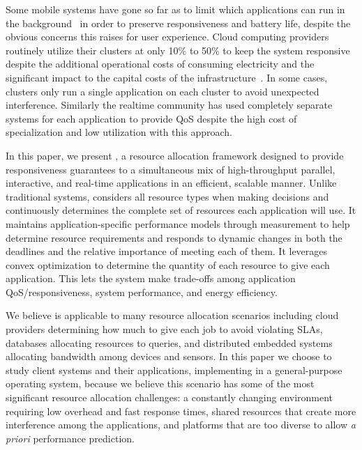 Some mobile systems have gone so far as to limit which applications can run in the background~\cite{iOsDev} in order to preserve responsiveness and battery life, despite the obvious concerns this raises for user experience.  Cloud computing providers routinely utilize their clusters at only 10\% to 50\% to keep the system responsive despite the additional operational costs of consuming electricity and the significant impact to the capital costs of the infrastructure~\cite{Barroso2009,Hennessy2011}.   In some cases, clusters only run a single application on each cluster to avoid unexpected interference.  Similarly the realtime community has used completely separate systems for each application to provide QoS despite the high cost of specialization and low utilization with this approach.

In this paper, we present \pacora, a resource allocation framework designed to provide responsiveness guarantees to a simultaneous mix of high-throughput parallel, interactive, and real-time applications in an efficient, scalable manner.  Unlike traditional systems, \pacora considers all resource types when making decisions and continuously determines the complete set of resources each application will use.   It maintains application-specific performance models through measurement to help determine resource requirements and responds to dynamic changes in both the deadlines and the relative importance of meeting each of them. It leverages convex optimization to determine the quantity of each resource to give each application. This lets the system make trade-offs among application QoS/responsiveness, system performance, and energy efficiency.

We believe \pacora is applicable to many resource allocation scenarios including cloud providers determining how much to give each job to avoid violating SLAs, databases allocating resources to queries, and distributed embedded systems allocating bandwidth among devices and sensors.  In this paper we choose to study client systems and their applications, implementing \pacora in a general-purpose operating system, because we believe this scenario has some of the most significant resource allocation challenges: a constantly changing environment requiring low overhead and fast response times, shared resources that create more interference among the applications, and platforms that are too diverse to allow \emph{a priori} performance prediction.

